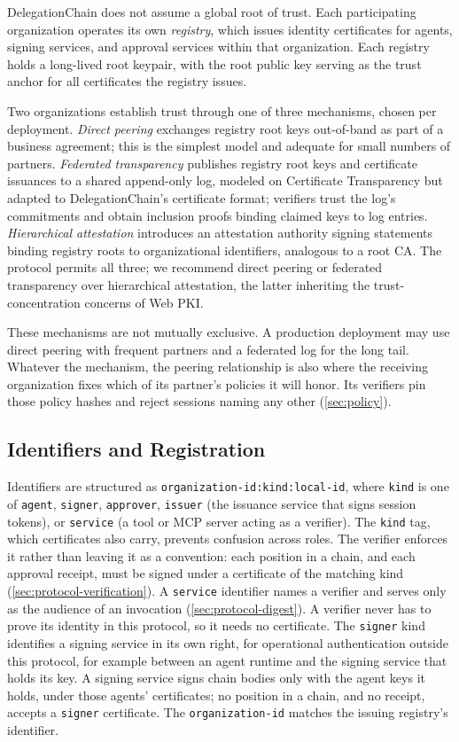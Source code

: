 \documentclass[11pt,a4paper]{article}
\begin{document}
DelegationChain does not assume a global root of trust. Each
participating organization operates its own \emph{registry}, which
issues identity certificates for agents, signing services, and
approval services within that organization. Each registry holds a
long-lived root keypair, with the root public key serving as the trust
anchor for all certificates the registry issues.

Two organizations establish trust through one of three mechanisms,
chosen per deployment. \emph{Direct peering} exchanges registry root
keys out-of-band as part of a business agreement; this is the simplest
model and adequate for small numbers of partners. \emph{Federated
transparency} publishes registry root keys and certificate issuances
to a shared append-only log, modeled on Certificate Transparency
\citep{rfc9162} but adapted to DelegationChain's certificate format;
verifiers trust the log's commitments and obtain inclusion proofs
binding claimed keys to log entries. \emph{Hierarchical attestation}
introduces an attestation authority signing statements binding
registry roots to organizational identifiers, analogous to a root
CA. The protocol permits all three; we recommend direct peering or
federated transparency over hierarchical attestation, the latter
inheriting the trust-concentration concerns of Web PKI.

These mechanisms are not mutually exclusive. A production deployment
may use direct peering with frequent partners and a federated log for
the long tail. Whatever the mechanism, the peering relationship is also
where the receiving organization fixes which of its partner's policies
it will honor. Its verifiers pin those policy hashes and reject
sessions naming any other (\cref{sec:policy}).

\subsection{Identifiers and Registration}
\label{sec:identity-registration}

Identifiers are structured as
\texttt{organization-id:kind:local-id}, where \texttt{kind} is one of
\texttt{agent}, \texttt{signer}, \texttt{approver}, \texttt{issuer} (the
issuance service that signs session tokens), or \texttt{service} (a
tool or MCP server acting as a verifier). The \texttt{kind} tag, which
certificates also carry, prevents confusion across roles. The verifier
enforces it rather than leaving it as a convention: each position in a
chain, and each approval receipt, must be signed under a certificate of
the matching kind (\cref{sec:protocol-verification}). A
\texttt{service} identifier names a verifier and serves only as the
audience of an invocation (\cref{sec:protocol-digest}). A verifier never
has to prove its identity in this protocol, so it needs no certificate.
The \texttt{signer} kind identifies a signing service in its own right,
for operational authentication outside this protocol, for example
between an agent runtime and the signing service that holds its key. A
signing service signs chain bodies only with the agent keys it holds,
under those agents' certificates; no position in a chain, and no
receipt, accepts a \texttt{signer} certificate. The
\texttt{organization-id} matches the issuing registry's identifier.
\end{document}
